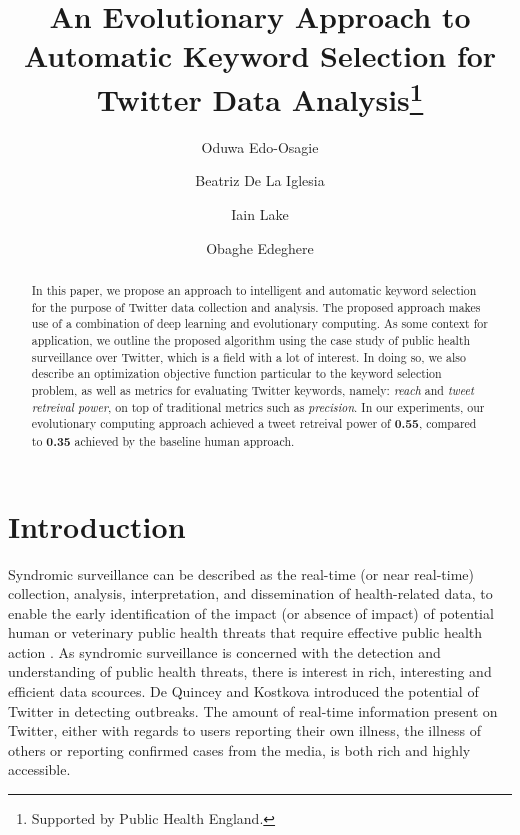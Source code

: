 \documentclass[runningheads]{llncs}
\begin{document}
%
\title{An Evolutionary Approach to Automatic Keyword Selection for Twitter Data Analysis\thanks{Supported by Public Health England.}}
%
%
\author{Oduwa Edo-Osagie \and Beatriz De La Iglesia \and Iain Lake \and Obaghe Edeghere }
%


\maketitle              %
%
\begin{abstract}
In this paper, we propose an approach to intelligent and automatic keyword selection for the purpose of Twitter data collection and analysis. The proposed approach makes use of a combination of deep learning and evolutionary computing. As some context for application, we outline the proposed algorithm using the case study of public health surveillance over Twitter, which is a field with a lot of interest. In doing so, we also describe an optimization objective function particular to the keyword selection problem, as well as metrics for evaluating Twitter keywords, namely: \textit{reach} and \textit{tweet retreival power}, on top of traditional metrics such as \textit{precision}. In our experiments, our evolutionary computing approach achieved a tweet retreival power of \textbf{0.55}, compared to \textbf{0.35} achieved by the baseline human approach.

\end{abstract}
%
%
%
\section{Introduction}\label{Intro}
Syndromic surveillance can be described as the real-time (or near real-time) collection, analysis, interpretation, and dissemination of health-related data, to enable the early identification of the impact (or absence of impact) of potential human or veterinary public health threats that require effective public health action \cite{I_REF11}. As syndromic surveillance is concerned with the detection and understanding of public health threats, there is interest in rich, interesting and efficient data scources. De Quincey  and Kostkova \cite{I_REF15} introduced the potential of Twitter in detecting outbreaks. The amount of real-time information present on Twitter, either with regards to users reporting their own illness, the illness of others or reporting confirmed cases from the media, is both rich and highly accessible.
\end{document}
